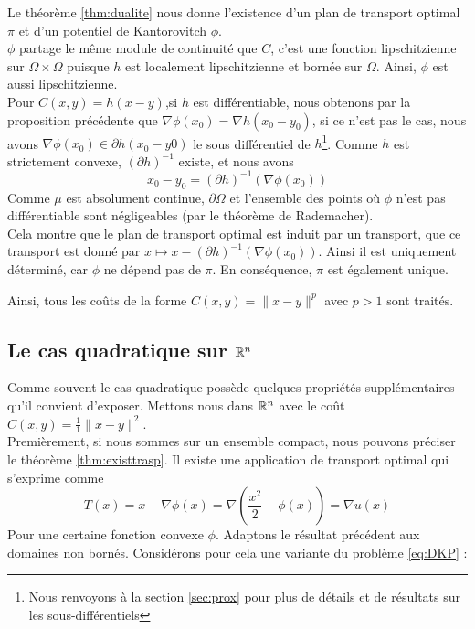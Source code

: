 \documentclass[a4paper,12pt]{article}
\begin{document}
\begin{preuve}
Le théorème \ref{thm:dualite} nous donne l'existence d'un plan de transport optimal $\pi$ et d'un potentiel de Kantorovitch $\phi$.\\

$\phi$ partage le même module de continuité que $C$, c'est une fonction lipschitzienne sur $\Omega\times\Omega$ puisque $h$ est localement lipschitzienne et bornée sur $\Omega$. Ainsi, $\phi$ est aussi lipschitzienne.\\

Pour $C(x,y) = h(x-y)$,si $h$ est différentiable, nous obtenons par la proposition précédente que $\nabla\phi (x_0)=\nabla h(x_0-y_0)$, si ce n'est pas le cas, nous avons $\nabla\phi(x_0)\in\partial h(x_0-y0)$ le sous différentiel de $h$\footnote{Nous renvoyons à la section \ref{sec:prox} pour plus de détails et de résultats sur les sous-différentiels}. Comme $h$ est strictement convexe, $(\partial h)^{-1}$ existe, et nous avons 
$$
x_0-y_0=(\partial h)^{-1}(\nabla\phi(x_0))
$$
Comme $\mu$ est absolument continue, $\partial\Omega$ et l'ensemble des points où $\phi$ n'est pas différentiable sont négligeables (par le théorème de Rademacher). \\

Cela montre que le plan de transport optimal est induit par un transport, que ce transport est donné par $x\mapsto x -(\partial h)^{-1}(\nabla\phi(x_0))$. Ainsi il est uniquement déterminé, car $\phi$ ne dépend pas de $\pi$. En conséquence, $\pi$ est également unique. 
\end{preuve}
Ainsi, tous les coûts de la forme $C(x,y) =\|x-y\|^p$ avec $p>1$ sont traités. 


\subsection{Le cas quadratique sur $\mathbb{R}^n$}
Comme souvent le cas quadratique possède quelques propriétés supplémentaires qu'il convient d'exposer. Mettons nous dans $\mathbb{R}^n $ avec le coût $C(x,y)=\frac{1}{1}\|x-y\|^2$.\\
Premièrement, si nous sommes sur un ensemble compact, nous pouvons préciser le théorème \eqref{thm:existtrasp}. Il existe une application de transport optimal qui s'exprime comme 
$$
T(x) = x -\nabla\phi(x) = \nabla\left(\frac{x^2}{2}-\phi(x)\right) = \nabla u(x)
$$
Pour une certaine fonction convexe $\phi$. Adaptons le résultat précédent aux domaines non bornés. Considérons pour cela une variante du problème \eqref{eq:DKP} : \\
\end{document}
